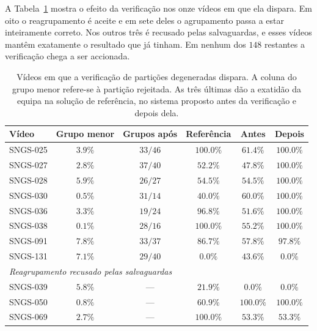 A Tabela~\ref{tab:regressoes} mostra o efeito da verificação nos onze vídeos em que ela dispara.
Em oito o reagrupamento é aceite e em sete deles o agrupamento passa a estar inteiramente correto.
Nos outros três é recusado pelas salvaguardas, e esses vídeos mantêm exatamente o resultado que já
tinham. Em nenhum dos $148$ restantes a verificação chega a ser accionada.

\begin{table}[htbp]
    \centering
    \caption{Vídeos em que a verificação de partições degeneradas dispara. A coluna do grupo menor
    refere-se à partição rejeitada. As três últimas dão a exatidão da equipa na solução de
    referência, no sistema proposto antes da verificação e depois dela.}
    \label{tab:regressoes}
    \begin{tabular}{|l|c|c|c|c|c|}
        \hline
        \textbf{Vídeo} & \textbf{Grupo menor} & \textbf{Grupos após} & \textbf{Referência} & \textbf{Antes} & \textbf{Depois} \\
        \hline
        SNGS-025 & $3.9\%$ & $33/46$ & $100.0\%$ & $61.4\%$ & $100.0\%$ \\
        \hline
        SNGS-027 & $2.8\%$ & $37/40$ & $52.2\%$ & $47.8\%$ & $100.0\%$ \\
        \hline
        SNGS-028 & $5.9\%$ & $26/27$ & $54.5\%$ & $54.5\%$ & $100.0\%$ \\
        \hline
        SNGS-030 & $0.5\%$ & $31/14$ & $40.0\%$ & $60.0\%$ & $100.0\%$ \\
        \hline
        SNGS-036 & $3.3\%$ & $19/24$ & $96.8\%$ & $51.6\%$ & $100.0\%$ \\
        \hline
        SNGS-038 & $0.1\%$ & $28/16$ & $100.0\%$ & $55.2\%$ & $100.0\%$ \\
        \hline
        SNGS-091 & $7.8\%$ & $33/37$ & $86.7\%$ & $57.8\%$ & $97.8\%$ \\
        \hline
        SNGS-131 & $7.1\%$ & $29/40$ & $0.0\%$ & $43.6\%$ & $0.0\%$ \\
        \hline
        \multicolumn{6}{|l|}{\emph{Reagrupamento recusado pelas salvaguardas}} \\
        \hline
        SNGS-039 & $5.8\%$ & --- & $21.9\%$ & $0.0\%$ & $0.0\%$ \\
        \hline
        SNGS-050 & $0.8\%$ & --- & $60.9\%$ & $100.0\%$ & $100.0\%$ \\
        \hline
        SNGS-069 & $2.7\%$ & --- & $100.0\%$ & $53.3\%$ & $53.3\%$ \\
        \hline
    \end{tabular}
\end{table}

